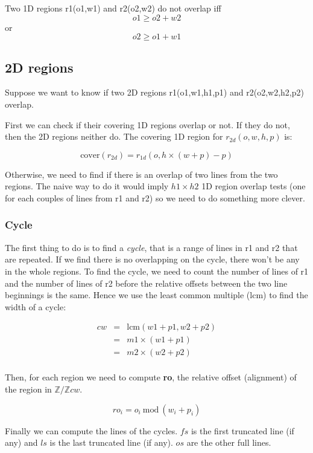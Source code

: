 \documentclass[twocolumn]{article}
\begin{document}
Two 1D regions r1(o1,w1) and r2(o2,w2) do not overlap iff 
\[ o1 \ge o2+w2 \] or \[o2 \ge o1 + w1 \]

\subsection{2D regions}

Suppose we want to know if two 2D regions r1(o1,w1,h1,p1) and r2(o2,w2,h2,p2)
overlap.

First we can check if their covering 1D regions overlap or not. If they do not,
then the 2D regions neither do. The covering 1D region for $r_{2d}(o,w,h,p)$ is:

\[ \textrm{cover}(r_{2d}) = r_{1d}(o, h \times (w + p) - p) \]

Otherwise, we need to find if there is an overlap of two lines from the two
regions. The naive way to do it would imply $h1 \times h2$ 1D region overlap
tests (one for each couples of lines from r1 and r2) so we need to do something
more clever.

\subsubsection{Cycle}

The first thing to do is to find a \emph{cycle}, that is a range of lines in r1
and r2 that are repeated. If we find there is no overlapping on the cycle, there
won't be any in the whole regions. To find the cycle, we need to count the number
of lines of r1 and the number of lines of r2 before the relative offsets between
the two line beginnings is the same. Hence we use the least common multiple
(lcm) to find the width of a cycle:

\[
\begin{array}{rcl}
cw &=& \textrm{lcm} (w1+p1,w2+p2) \\
   &=& m1 \times (w1 + p1) \\ 
   &=& m2 \times (w2 + p2) \\
\end{array}
\]

Then, for each region we need to compute \textbf{ro}, the relative offset
(alignment) of the region in $\mathbb{Z}/\mathbb{Z}cw$.

\[ ro_i  = o_i\ \textrm{mod}\ (w_i + p_i) \]

Finally we can compute the lines of the cycles. $fs$ is the first truncated line
(if any) and $ls$ is the last truncated line (if any). $os$ are the other
full lines.
\end{document}
